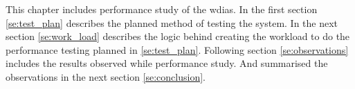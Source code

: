 
This chapter includes performance study of the \acrshort{wdias}. In the first section \ref{se:test_plan} describes the planned method of testing the system.
In the next section \ref{se:work_load} describes the logic behind creating the workload to do the performance testing planned in \ref{se:test_plan}.
Following section \ref{se:observations} includes the results observed while performance study. And summarised the observations in the next section \ref{se:conclusion}.


